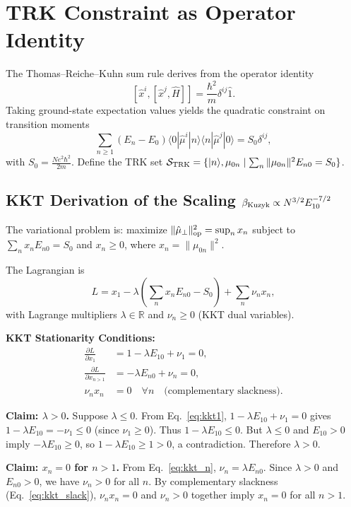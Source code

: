 \documentclass[11pt]{article}
\begin{document}
\section{TRK Constraint as Operator Identity}

The Thomas--Reiche--Kuhn sum rule derives from the operator identity
\[
[\hat{x}^i,[\hat{x}^j,\hat{H}]]=\frac{\hbar^2}{m}\delta^{ij}\hat{1}.
\]
Taking ground-state expectation values yields the quadratic constraint on transition moments
\[
\sum_{n\ge1}(E_n-E_0)\langle0|\hat{\mu}^i|n\rangle\langle n|\hat{\mu}^j|0\rangle = S_0 \delta^{ij},
\]
with $S_0 = \frac{Ne^2\hbar^2}{2m}$. Define the TRK set $\mathcal{S}_{\rm TRK} = \{|n\rangle, \mu_{0n} \mid \sum_n \|\mu_{0n}\|^2 E_{n0} = S_0\}$.

\subsection{KKT Derivation of the Scaling $\beta_{\rm Kuzyk} \propto N^{3/2}E_{10}^{-7/2}$}

The variational problem is: maximize $\|\hat{\mu}_\perp\|_{\rm op}^2 = \sup_n x_n$ subject to $\sum_n x_n E_{n0} = S_0$ and $x_n \ge 0$, where $x_n = \|\mu_{0n}\|^2$.

The Lagrangian is
\[
L = x_1 - \lambda \left(\sum_n x_n E_{n0} - S_0\right) + \sum_n \nu_n x_n,
\]
with Lagrange multipliers $\lambda \in \mathbb{R}$ and $\nu_n \ge 0$ (KKT dual variables).

\textbf{KKT Stationarity Conditions:}
\begin{align}
\frac{\partial L}{\partial x_1} &= 1 - \lambda E_{10} + \nu_1 = 0, \label{eq:kkt1}\\
\frac{\partial L}{\partial x_{n>1}} &= -\lambda E_{n0} + \nu_n = 0, \label{eq:kkt_n}\\
\nu_n x_n &= 0 \quad \forall n \quad \text{(complementary slackness)}. \label{eq:kkt_slack}
\end{align}

\textbf{Claim: $\lambda > 0$.} Suppose $\lambda \le 0$. From Eq.~\eqref{eq:kkt1}, $1 - \lambda E_{10} + \nu_1 = 0$ gives $1 - \lambda E_{10} = -\nu_1 \le 0$ (since $\nu_1 \ge 0$). Thus $1 - \lambda E_{10} \le 0$. But $\lambda \le 0$ and $E_{10} > 0$ imply $-\lambda E_{10} \ge 0$, so $1 - \lambda E_{10} \ge 1 > 0$, a contradiction. Therefore $\lambda > 0$.

\textbf{Claim: $x_n = 0$ for $n > 1$.} From Eq.~\eqref{eq:kkt_n}, $\nu_n = \lambda E_{n0}$. Since $\lambda > 0$ and $E_{n0} > 0$, we have $\nu_n > 0$ for all $n$. By complementary slackness (Eq.~\eqref{eq:kkt_slack}), $\nu_n x_n = 0$ and $\nu_n > 0$ together imply $x_n = 0$ for all $n > 1$.
\end{document}
